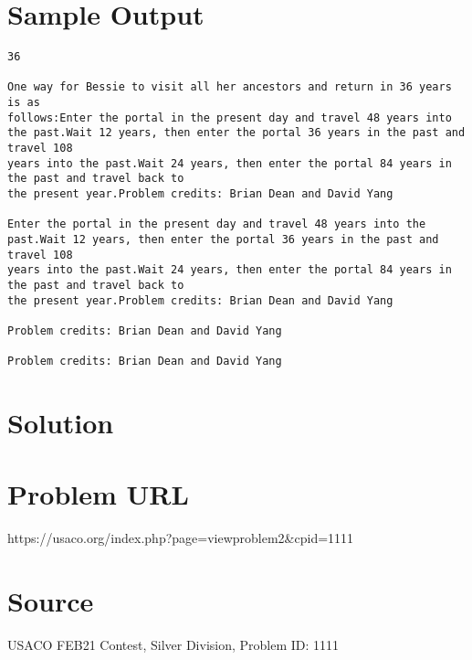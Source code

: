 \documentclass[12pt]{article}
\begin{document}
\section*{Sample Output}
\begin{verbatim}
36

One way for Bessie to visit all her ancestors and return in 36 years is as
follows:Enter the portal in the present day and travel 48 years into the past.Wait 12 years, then enter the portal 36 years in the past and travel 108
years into the past.Wait 24 years, then enter the portal 84 years in the past and travel back to
the present year.Problem credits: Brian Dean and David Yang

Enter the portal in the present day and travel 48 years into the past.Wait 12 years, then enter the portal 36 years in the past and travel 108
years into the past.Wait 24 years, then enter the portal 84 years in the past and travel back to
the present year.Problem credits: Brian Dean and David Yang

Problem credits: Brian Dean and David Yang

Problem credits: Brian Dean and David Yang
\end{verbatim}

\section*{Solution}


\section*{Problem URL}
https://usaco.org/index.php?page=viewproblem2&cpid=1111

\section*{Source}
USACO FEB21 Contest, Silver Division, Problem ID: 1111
\end{document}

